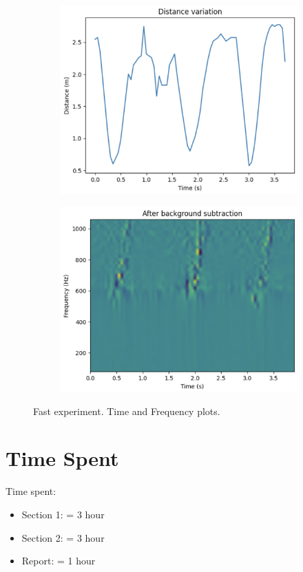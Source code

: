 \documentclass{lab}
\begin{document}
\begin{figure}[h]
    \centering
    \begin{subfigure}[b]{0.48\textwidth}
        \centering
        \includegraphics[width=\textwidth]{images/fast-time.png}
    \end{subfigure}
    \hfill
    \begin{subfigure}[b]{0.48\textwidth}
        \centering
        \includegraphics[width=\textwidth]{images/fast-freq.png}
    \end{subfigure}
    \caption{Fast experiment. Time and Frequency plots.}
\end{figure}


\section{Time Spent} 

Time spent:

\begin{itemize}
  \item Section 1: = 3 hour
  \item Section 2: = 3 hour
  \item Report: = 1 hour
\end{itemize}
\end{document}
